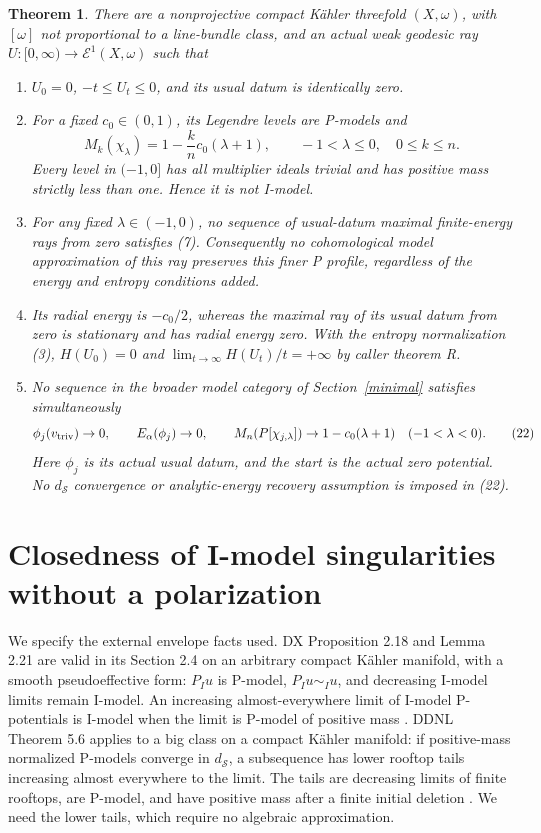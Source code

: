 \documentclass[11pt]{article}
\newtheorem{theorem}{Theorem}
\newcommand{\ds}{d_{\mathcal S}}
\newcommand{\Eone}{\mathcal E^1}
\begin{document}
\begin{theorem}\label{main}
There are a nonprojective compact K\"ahler threefold $(X,\omega)$,
with $[\omega]$ not proportional to a line-bundle class, and an actual
weak geodesic ray $U:[0,\infty)\to\Eone(X,\omega)$ such that
\begin{enumerate}
\item $U_0=0$, $-t\le U_t\le0$, and its usual datum is identically zero.
\item For a fixed $c_0\in(0,1)$, its Legendre levels are P-models and
\[
 M_k(\chi_\lambda)=1-\frac{k}{n}c_0(\lambda+1),
       \qquad -1<\lambda\le0,
       \quad 0\le k\le n.                                 \tag{8}
\]
Every level in $(-1,0]$ has all multiplier ideals trivial and has
positive mass strictly less than one. Hence it is not I-model.
\item For any fixed $\lambda\in(-1,0)$, no sequence of usual-datum
maximal finite-energy rays from zero satisfies (7). Consequently no
cohomological model approximation of this ray preserves this finer
P profile, regardless of the energy and entropy conditions added.
\item Its radial energy is $-c_0/2$, whereas the maximal ray of its
usual datum from zero is stationary and has radial energy zero.
With the entropy normalization (3), $H(U_0)=0$ and
$\lim_{t\to\infty}H(U_t)/t=+\infty$ by caller theorem R.
\item No sequence in the broader model category of Section~\ref{minimal}
satisfies simultaneously
\[
 \phi_j(v_{\rm triv})\to0,\qquad E_\alpha(\phi_j)\to0,
 \qquad M_n(P[\chi_{j,\lambda}])\to
               1-c_0(\lambda+1)\quad(-1<\lambda<0).       \tag{22}
\]
Here $\phi_j$ is its actual usual datum, and the start is the actual
zero potential. No $d_{\mathcal S}$ convergence or analytic-energy
recovery assumption is imposed in (22).
\end{enumerate}
\end{theorem}

\section{Closedness of I-model singularities without a polarization}
We specify the external envelope facts used. DX Proposition 2.18 and
Lemma 2.21 are valid in its Section 2.4 on an arbitrary compact
K\"ahler manifold, with a smooth pseudoeffective form: $P_Iu$ is
P-model, $P_Iu\sim_Iu$, and decreasing I-model limits remain I-model.
An increasing almost-everywhere limit of I-model P-potentials is
I-model when the limit is P-model of positive mass \cite{DX}.
DDNL Theorem 5.6 applies to a big class on a compact K\"ahler
manifold: if positive-mass normalized P-models converge in $\ds$,
a subsequence has lower rooftop tails increasing almost everywhere
to the limit. The tails are decreasing limits of finite rooftops,
are P-model, and have positive mass after a finite initial deletion
\cite{DDNL}. We need the lower tails, which require no algebraic
approximation.
\end{document}
